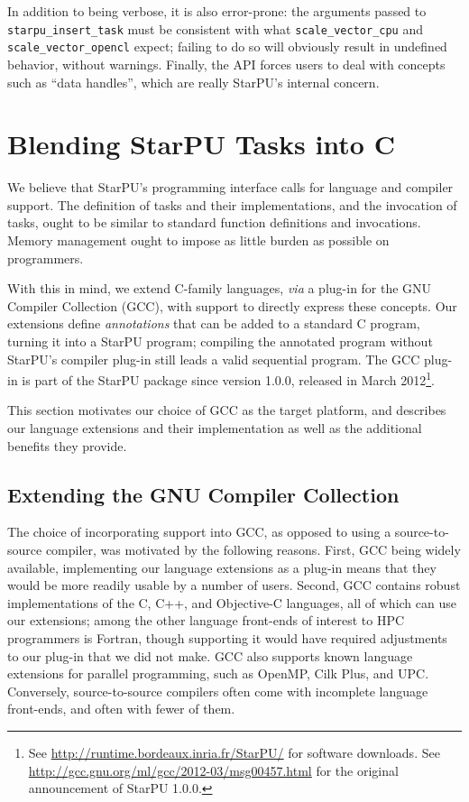 \documentclass[twoside, a4paper, 10pt]{article}
\begin{document}
In addition to being verbose, it is also error-prone: the arguments
passed to \texttt{starpu\_insert\_task} must be consistent with what
\texttt{scale\_vector\_cpu} and \texttt{scale\_vector\_opencl} expect; failing to do so
will obviously result in undefined behavior, without warnings.
Finally, the API forces users to deal with concepts such as ``data
handles'', which are really StarPU's internal concern.
\section{Blending StarPU Tasks into C}
\label{sec-3}


We believe that StarPU's programming interface calls for language and
compiler support.  The definition of tasks and their implementations, and
the invocation of tasks, ought to be similar to standard function
definitions and invocations.  Memory management ought to impose as
little burden as possible on programmers.

With this in mind, we extend C-family languages, \emph{via} a plug-in for the
GNU Compiler Collection (GCC), with support to directly express these
concepts.  Our extensions define \emph{annotations} that can be added to a
standard C program, turning it into a StarPU program; compiling the
annotated program without StarPU's compiler plug-in still leads a valid
sequential program.  The GCC plug-in is part of the StarPU package since version
1.0.0, released in March 2012\footnote{See \href{http://runtime.bordeaux.inria.fr/StarPU/}{http://runtime.bordeaux.inria.fr/StarPU/} for software
  downloads.  See \href{http://gcc.gnu.org/ml/gcc/2012-03/msg00457.html}{http://gcc.gnu.org/ml/gcc/2012-03/msg00457.html} for
  the original announcement of StarPU 1.0.0.
 }.

This section motivates our choice of GCC as the target platform, and
describes our language extensions and their implementation as well as
the additional benefits they provide.
\subsection{Extending the GNU Compiler Collection}
\label{sec-3-1}


The choice of incorporating support into GCC, as opposed to using a
source-to-source compiler, was motivated by the following reasons.
First, GCC being widely available, implementing our language extensions
as a plug-in means that they would be more readily usable by a number of
users.  Second, GCC contains robust implementations of the C, C++, and
Objective-C languages, all of which can use our extensions; among the
other language front-ends of interest to HPC programmers is Fortran,
though supporting it would have required adjustments to our plug-in that
we did not make.  GCC also supports known language extensions for
parallel programming, such as OpenMP, Cilk Plus, and UPC.  Conversely,
source-to-source compilers often come with incomplete language
front-ends, and often with fewer of them.
\end{document}
